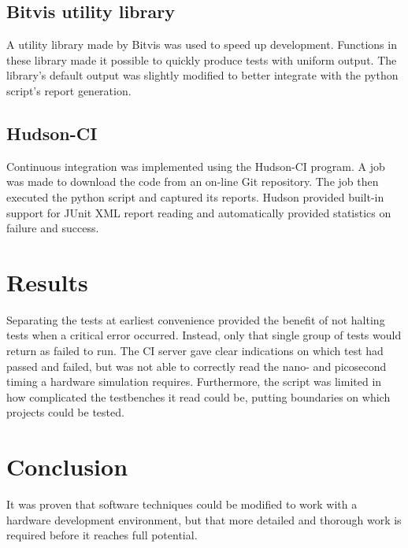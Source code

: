 \documentclass[twoside]{article}
\begin{document}
\begin{multicols}{2}
\subsection{Bitvis utility library}
A utility library made by Bitvis was used to speed up development. Functions in these library made it possible to quickly produce tests with uniform output. The library's default output was slightly modified to better integrate with the python script's report generation.

\subsection{Hudson-CI}
Continuous integration was implemented using the Hudson-CI program. A job was made to download the code from an on-line Git repository. The job then executed the python script and captured its reports. Hudson provided built-in support for JUnit XML report reading and automatically provided statistics on failure and success.

\section{Results}
Separating the tests at earliest convenience provided the benefit of not halting tests when a critical error occurred. Instead, only that single group of tests would return as failed to run. The CI server gave clear indications on which test had passed and failed, but was not able to correctly read the nano- and picosecond timing a hardware simulation requires. Furthermore, the script was limited in how complicated the testbenches it read could be, putting boundaries on which projects could be tested.

\section{Conclusion}
It was proven that software techniques could be modified to work with a hardware development environment, but that more detailed and thorough work is required before it reaches full potential. 

\renewcommand*{\bibfont}{\footnotesize}
\printbibliography


\end{multicols}
\end{document}
